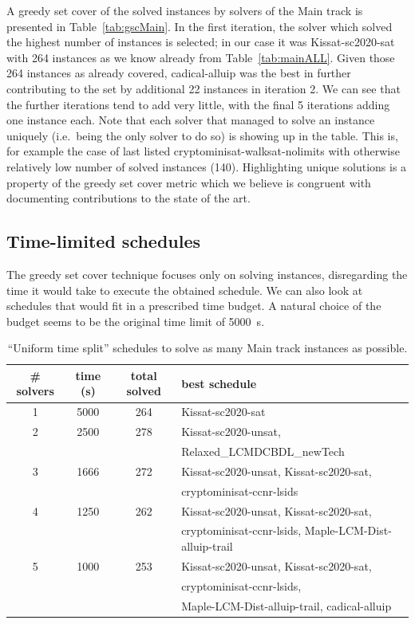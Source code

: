 \documentclass{elsarticle}
\begin{document}
A greedy set cover of the solved instances by solvers of the Main track is presented 
in Table~\ref{tab:gscMain}. In the first iteration, the solver which solved the highest number 
of instances is selected; in our case it was Kissat-sc2020-sat with 264 instances
as we know already from Table~\ref{tab:mainALL}.
Given those 264 instances as already covered, cadical-alluip was the best in further contributing
to the set by additional 22 instances in iteration 2.
We can see that the further iterations tend to add very little,
with the final 5 iterations adding one instance each. Note that each solver
that managed to solve an instance uniquely (i.e.~being the only solver to do so)
is showing up in the table. This is, for example the case of last listed  
cryptominisat-walksat-nolimits with otherwise relatively low number of solved instances (140).
Highlighting unique solutions is a property of the greedy set cover metric
which we believe is congruent with documenting contributions to the state of the art.

\subsection{Time-limited schedules}

The greedy set cover technique focuses only on solving instances,
disregarding the time it would take to execute the obtained schedule. We can
also look at schedules that would fit in a prescribed time budget. A natural choice
of the budget seems to be the original time limit of \SI{5000}{\second}.

\begin{table}
\caption{``Uniform time split'' schedules %
to solve as many Main track instances as possible.}
\label{tab:MainUniformTimeSplit}
\begin{center}
\begin{tabular}{cccl}
\# solvers & time (s) & total solved & best schedule \\
\hline
1 & 5000 & 264 & Kissat-sc2020-sat \\
2 & 2500 & 278 & Kissat-sc2020-unsat, \\
             &&& Relaxed\_LCMDCBDL\_newTech \\
3 & 1666 & 272 & Kissat-sc2020-unsat, Kissat-sc2020-sat, \\
			 &&& cryptominisat-ccnr-lsids \\
4 & 1250 & 262 & Kissat-sc2020-unsat, Kissat-sc2020-sat, \\
			 &&& cryptominisat-ccnr-lsids, Maple-LCM-Dist-alluip-trail \\ 
5 & 1000 & 253 & Kissat-sc2020-unsat, Kissat-sc2020-sat, \\
			&&& cryptominisat-ccnr-lsids, \\
			&&& Maple-LCM-Dist-alluip-trail, cadical-alluip \\
\end{tabular}
\end{center}
\end{table}
\end{document}

